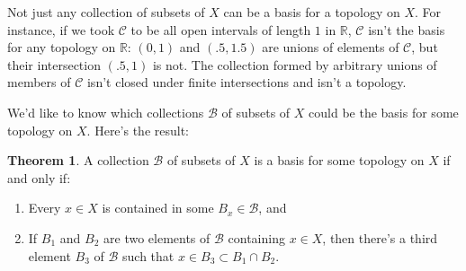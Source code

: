 \documentclass[12pt]{article}
\theoremstyle{definition}
\newtheorem*{thm}{Theorem}
\begin{document}
Not just any collection of subsets of $X$ can be a basis for a topology on $X$.  For instance, if we took $\mathcal{C}$ to be all open intervals of length $1$ in $\mathbb{R}$, $\mathcal{C}$ isn't the basis for any topology on $\mathbb{R}$: $(0,1)$ and $(.5, 1.5)$ are unions of elements of $\mathcal{C}$, but their intersection $(.5,1)$ is not.  The collection formed by arbitrary unions of members of $\mathcal{C}$ isn't closed under finite intersections and isn't a topology.

We'd like to know which collections $\mathcal{B}$ of subsets of $X$ could be the basis for some topology on $X$.  Here's the result:

\begin{thm}
A collection $\mathcal{B}$ of subsets of $X$ is a basis for some topology on $X$ if and only if:
\begin{enumerate}
\item
Every $x\in X$ is contained in some $B_x\in \mathcal{B}$, and
\item
If $B_1$ and $B_2$ are two elements of $\mathcal{B}$ containing $x\in X$, then there's a third element $B_3$ of $\mathcal{B}$ such that $x\in B_3\subset B_1\cap B_2$. 
\end{enumerate}

\end{thm}
\end{document}
